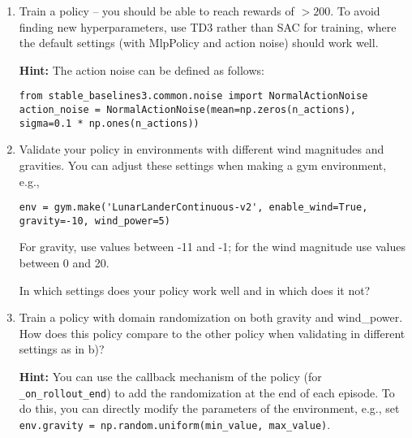 \begin{enumerate}
    \item Train a policy -- you should be able to reach rewards of $>200$. To avoid finding new hyperparameters, use TD3 rather than SAC for training, where the default settings (with MlpPolicy and action noise) should work well.

    \textbf{Hint:} The action noise can be defined as follows:
\begin{code}
\begin{Verbatim}[numbers=none,fontsize=\footnotesize]
from stable_baselines3.common.noise import NormalActionNoise
action_noise = NormalActionNoise(mean=np.zeros(n_actions), sigma=0.1 * np.ones(n_actions))
\end{Verbatim}
\end{code}

    \item Validate your policy in environments with different wind magnitudes and gravities. You can adjust these settings when making a gym environment, e.g., 
\begin{code}
\begin{Verbatim}[numbers=none,fontsize=\footnotesize]
env = gym.make('LunarLanderContinuous-v2', enable_wind=True, gravity=-10, wind_power=5)
\end{Verbatim}
\end{code}
    For gravity, use values between -11 and -1; for the wind magnitude use values between 0 and 20.

    In which settings does your policy work well and in which does it not?

    \item Train a policy with domain randomization on both gravity and wind\_power. How does this policy compare to the other policy when validating in different settings as in b)?
    
    \textbf{Hint:} You can use the callback mechanism of the policy (for \texttt{\_on\_rollout\_end}) to add the randomization at the end of each episode. To do this, you can directly modify the parameters of the environment, e.g., set \texttt{env.gravity = \newline np.random.uniform(min\_value, max\_value)}.
\end{enumerate}


\ifthenelse{\isundefined{\scripthead}}{


}{}


\exerfoot
